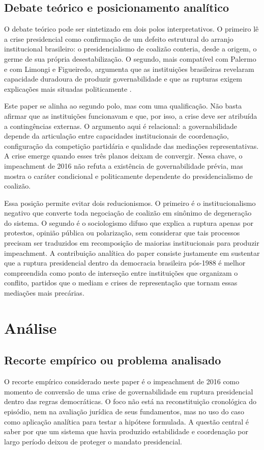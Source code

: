 \documentclass[12pt,a4paper]{article}
\begin{document}
\subsection{Debate teórico e posicionamento analítico}
\label{sec:org33bffd0}
O debate teórico pode ser sintetizado em dois polos interpretativos. O primeiro lê a crise presidencial como confirmação de um defeito estrutural do arranjo institucional brasileiro: o presidencialismo de coalizão conteria, desde a origem, o germe de sua própria desestabilização. O segundo, mais compatível com Palermo e com Limongi e Figueiredo, argumenta que as instituições brasileiras revelaram capacidade duradoura de produzir governabilidade e que as rupturas exigem explicações mais situadas politicamente \textcite{palermo2000_como_se} \textcite{limongi2017_a_crise}.

Este paper se alinha ao segundo polo, mas com uma qualificação. Não basta afirmar que as instituições funcionavam e que, por isso, a crise deve ser atribuída a contingências externas. O argumento aqui é relacional: a governabilidade depende da articulação entre capacidades institucionais de coordenação, configuração da competição partidária e qualidade das mediações representativas. A crise emerge quando esses três planos deixam de convergir. Nessa chave, o impeachment de 2016 não refuta a existência de governabilidade prévia, mas mostra o caráter condicional e politicamente dependente do presidencialismo de coalizão.

Essa posição permite evitar dois reducionismos. O primeiro é o institucionalismo negativo que converte toda negociação de coalizão em sinônimo de degeneração do sistema. O segundo é o sociologismo difuso que explica a ruptura apenas por protestos, opinião pública ou polarização, sem considerar que tais processos precisam ser traduzidos em recomposição de maiorias institucionais para produzir impeachment. A contribuição analítica do paper consiste justamente em sustentar que a ruptura presidencial dentro da democracia brasileira pós-1988 é melhor compreendida como ponto de interseção entre instituições que organizam o conflito, partidos que o mediam e crises de representação que tornam essas mediações mais precárias.

\section{Análise}
\label{sec:org779ee01}
\subsection{Recorte empírico ou problema analisado}
\label{sec:orgb88edc8}
O recorte empírico considerado neste paper é o impeachment de 2016 como momento de conversão de uma crise de governabilidade em ruptura presidencial dentro das regras democráticas. O foco não está na reconstituição cronológica do episódio, nem na avaliação jurídica de seus fundamentos, mas no uso do caso como aplicação analítica para testar a hipótese formulada. A questão central é saber por que um sistema que havia produzido estabilidade e coordenação por largo período deixou de proteger o mandato presidencial.
\end{document}
